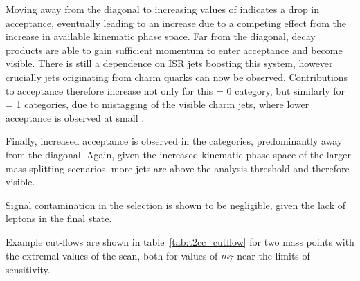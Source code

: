 Moving away from the 
diagonal to increasing values of \deltam indicates a drop in acceptance, 
eventually leading to an increase due to a competing effect from the increase in
available kinematic phase space. Far from the diagonal, decay products are able 
to gain sufficient momentum to enter acceptance and become visible. There
is still a dependence on ISR jets boosting this system, however crucially jets 
originating from charm quarks can now be observed. Contributions to acceptance
therefore increase not only for this \nb= 0 category, but similarly for \nb= 1
categories, due to mistagging of the visible charm jets, where lower
acceptance is observed at small \deltam.

Finally, increased acceptance is observed in the \njhigh categories, 
predominantly away from the diagonal. Again, given the increased kinematic phase
space of the larger mass splitting scenarios, more jets are above the analysis
threshold and therefore visible.


Signal contamination in the \mj selection is shown to be negligible, given the 
lack of leptons in the final state.

Example cut-flows are shown in table~\ref{tab:t2cc_cutflow} for two mass points
with the extremal \deltam values of the scan, both for values of $m_{\widetilde{t}}$
near the limits of sensitivity.


